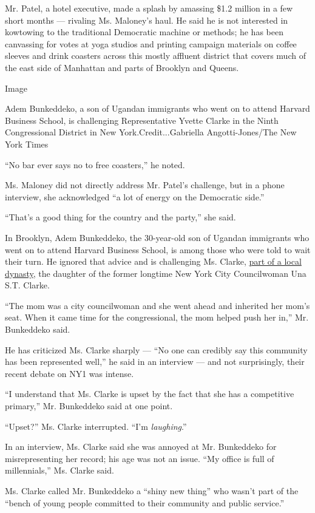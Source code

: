 Mr. Patel, a hotel executive, made a splash by amassing \$1.2 million in
a few short months --- rivaling Ms. Maloney's haul. He said he is not
interested in kowtowing to the traditional Democratic machine or
methods; he has been canvassing for votes at yoga studios and printing
campaign materials on coffee sleeves and drink coasters across this
mostly affluent district that covers much of the east side of Manhattan
and parts of Brooklyn and Queens.

Image

Adem Bunkeddeko, a son of Ugandan immigrants who went on to attend
Harvard Business School, is challenging Representative Yvette Clarke in
the Ninth Congressional District in New York.Credit...Gabriella
Angotti-Jones/The New York Times

``No bar ever says no to free coasters,'' he noted.

Ms. Maloney did not directly address Mr. Patel's challenge, but in a
phone interview, she acknowledged ``a lot of energy on the Democratic
side.''

``That's a good thing for the country and the party,'' she said.

In Brooklyn, Adem Bunkeddeko, the 30-year-old son of Ugandan immigrants
who went on to attend Harvard Business School, is among those who were
told to wait their turn. He ignored that advice and is challenging Ms.
Clarke,
\href{https://www.nytimes.com/2006/09/14/nyregion/14yvette.html}{part of
a local dynasty}, the daughter of the former longtime New York City
Councilwoman Una S.T. Clarke.

``The mom was a city councilwoman and she went ahead and inherited her
mom's seat. When it came time for the congressional, the mom helped push
her in,'' Mr. Bunkeddeko said.

He has criticized Ms. Clarke sharply --- ``No one can credibly say this
community has been represented well,'' he said in an interview --- and
not surprisingly, their recent debate on NY1 was intense.

``I understand that Ms. Clarke is upset by the fact that she has a
competitive primary,'' Mr. Bunkeddeko said at one point.

``Upset?'' Ms. Clarke interrupted. ``I'm \emph{laughing}.''

In an interview, Ms. Clarke said she was annoyed at Mr. Bunkeddeko for
misrepresenting her record; his age was not an issue. ``My office is
full of millennials,'' Ms. Clarke said.

Ms. Clarke called Mr. Bunkeddeko a ``shiny new thing'' who wasn't part
of the ``bench of young people committed to their community and public
service.''

